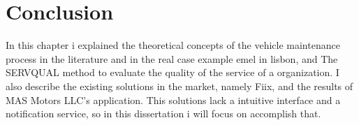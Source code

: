   

\section{Conclusion}

In this chapter i explained the theoretical concepts of the vehicle maintenance process in the literature and in the real case example \acs{emel} in lisbon, and The SERVQUAL method to evaluate the quality of the service of a organization.
I also describe the existing solutions in the market, namely Fiix, and the results of MAS Motors LLC's application.
This solutions lack a intuitive interface and a notification service, so in this dissertation i will focus on accomplish that.

